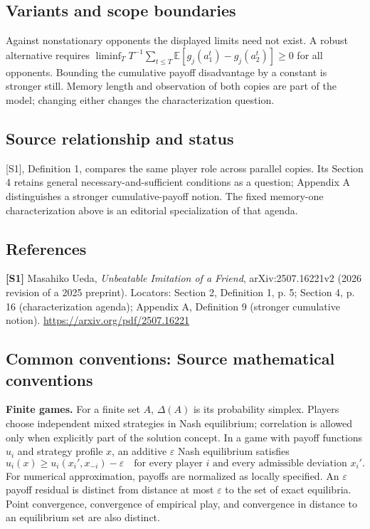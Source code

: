 \documentclass[11pt,a4paper]{article}
\begin{document}
\subsection*{Variants and scope boundaries}
Against nonstationary opponents the displayed limits need not exist. A robust alternative requires $\liminf_T T^{-1}\sum_{t\leq T}\mathbb E[g_j(a_1^t)-g_j(a_2^t)]\geq0$ for all opponents. Bounding the cumulative payoff disadvantage by a constant is stronger still. Memory length and observation of both copies are part of the model; changing either changes the characterization question.
\subsection*{Source relationship and status}
[S1], Definition 1, compares the same player role across parallel copies. Its Section 4 retains general necessary-and-sufficient conditions as a question; Appendix A distinguishes a stronger cumulative-payoff notion. The fixed memory-one characterization above is an editorial specialization of that agenda.
\subsection*{References}
\begingroup\footnotesize\raggedright
\textbf{[S1]} Masahiko Ueda, \emph{Unbeatable Imitation of a Friend}, arXiv:2507.16221v2 (2026 revision of a 2025 preprint). Locators: Section 2, Definition 1, p. 5; Section 4, p. 16 (characterization agenda); Appendix A, Definition 9 (stronger cumulative notion). \url{https://arxiv.org/pdf/2507.16221}
\par\endgroup

\subsection*{Common conventions: Source mathematical conventions}

\textbf{Finite games.} For a finite set $A$, $\Delta(A)$ is its probability
simplex. Players choose independent mixed strategies in Nash equilibrium;
correlation is allowed only when explicitly part of the solution concept.
In a game with payoff functions $u_i$ and strategy profile $x$, an additive
$\varepsilon$ Nash equilibrium satisfies
\[
 u_i(x)\geq u_i(x_i',x_{-i})-\varepsilon
 \quad\text{for every player $i$ and every admissible deviation $x_i'$}.
\]
For numerical approximation, payoffs are normalized as locally specified.
An $\varepsilon$ payoff residual is distinct from distance at most
$\varepsilon$ to the set of exact equilibria. Point convergence, convergence
of empirical play, and convergence in distance to an equilibrium set are
also distinct.
\end{document}
